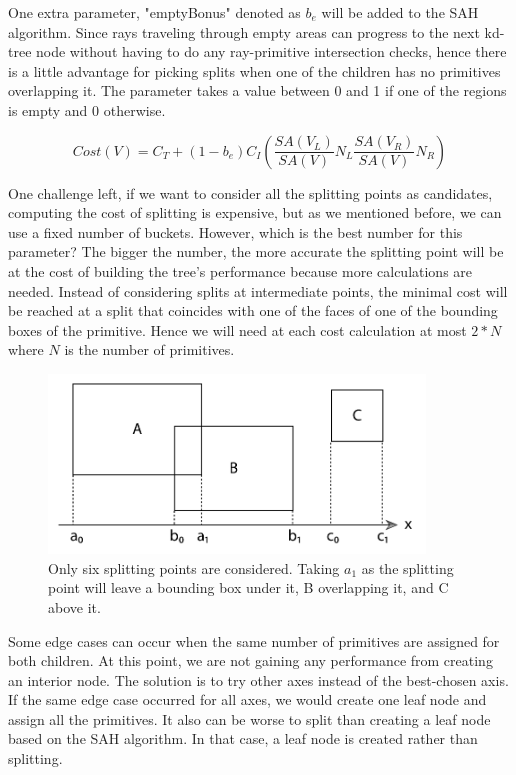 \documentclass[11pt,a4paper]{article}
\begin{document}
One extra parameter, "emptyBonus" denoted as $b_e$ will be added to the SAH algorithm. Since rays traveling through empty areas can progress to the next kd-tree node without having to do any ray-primitive intersection checks, hence there is a little advantage for picking splits when one of the children has no primitives overlapping it. The parameter takes a value between 0 and 1 if one of the regions is empty and 0 otherwise. 

\begin{equation}
Cost(V) = C_T + (1-b_e)C_I(\frac{SA(V_L)}{SA(V)}N_L \frac{SA(V_R)}{SA(V)}N_R)
\end{equation}

One challenge left, if we want to consider all the splitting points as candidates, computing the cost of splitting is expensive, but as we mentioned before, we can use a fixed number of buckets. However, which is the best number for this parameter? The bigger the number, the more accurate the splitting point will be at the cost of building the tree's performance because more calculations are needed. Instead of considering splits at intermediate points, the minimal cost will be reached at a split that coincides with one of the faces of one of the bounding boxes of the primitive. Hence we will need at each cost calculation at most $2 * N$ where $N$ is the number of primitives.

\begin{figure}[H]	
     \centering
     \captionsetup{justification=centering,margin=2cm}
     \includegraphics[width=10cm]{images/kdtree/projected_bboxes.png}
     \caption{Only six splitting points are considered. Taking $a_1$ as the splitting point will leave a bounding box under it, B overlapping it, and C above it. \protect\cite{Pharr2016}}
        \label{fig:dice}
\end{figure}

Some edge cases can occur when the same number of primitives are assigned for both children. At this point, we are not gaining any performance from creating an interior node. The solution is to try other axes instead of the best-chosen axis. If the same edge case occurred for all axes, we would create one leaf node and assign all the primitives. It also can be worse to split than creating a leaf node based on the SAH algorithm. In that case, a leaf node is created rather than splitting. 
\\
\noindent
\end{document}
